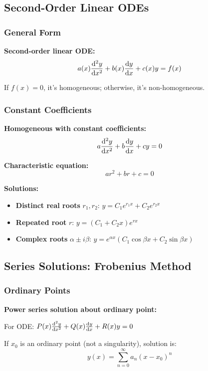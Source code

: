 \documentclass[12pt,a4paper]{article}
\begin{document}
\subsection{Second-Order Linear ODEs}
\subsubsection{General Form}
\begin{formulabox}
\textbf{Second-order linear ODE:}
\begin{equation}
a(x)\dv[2]{y}{x} + b(x)\dv{y}{x} + c(x)y = f(x)
\end{equation}

If $f(x) = 0$, it's homogeneous; otherwise, it's non-homogeneous.
\end{formulabox}

\subsubsection{Constant Coefficients}
\begin{formulabox}
\textbf{Homogeneous with constant coefficients:}
\begin{equation}
a\dv[2]{y}{x} + b\dv{y}{x} + cy = 0
\end{equation}

\textbf{Characteristic equation:}
\begin{equation}
ar^2 + br + c = 0
\end{equation}

\textbf{Solutions:}
\begin{itemize}
    \item \textbf{Distinct real roots} $r_1, r_2$: $y = C_1 e^{r_1 x} + C_2 e^{r_2 x}$
    \item \textbf{Repeated root} $r$: $y = (C_1 + C_2 x)e^{rx}$
    \item \textbf{Complex roots} $\alpha \pm i\beta$: $y = e^{\alpha x}(C_1 \cos\beta x + C_2 \sin\beta x)$
\end{itemize}
\end{formulabox}

\subsection{Series Solutions: Frobenius Method}
\subsubsection{Ordinary Points}
\begin{formulabox}
\textbf{Power series solution about ordinary point:}

For ODE: $P(x)\dv[2]{y}{x} + Q(x)\dv{y}{x} + R(x)y = 0$

If $x_0$ is an ordinary point (not a singularity), solution is:
\begin{equation}
y(x) = \sum_{n=0}^{\infty} a_n (x - x_0)^n
\end{equation}
\end{formulabox}
\end{document}
